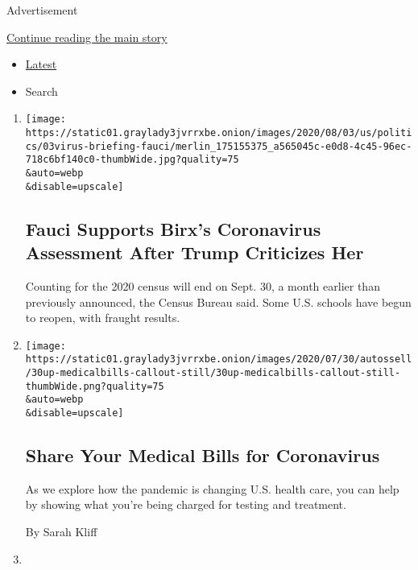 Advertisement

\protect\hyperlink{after-mid2}{Continue reading the main story}

\begin{itemize}
\tightlist
\item
  \protect\hyperlink{stream-panel}{Latest}
\item
  Search
\end{itemize}

\begin{enumerate}
\def\labelenumi{\arabic{enumi}.}
\item
  \href{/2020/08/03/world/coronavirus-covid-19.html}{}

  \texttt{[image: https://static01.graylady3jvrrxbe.onion/images/2020/08/03/us/politics/03virus-briefing-fauci/merlin\_175155375\_a565045c-e0d8-4c45-96ec-718c6bf140c0-thumbWide.jpg?quality=75\\\&auto=webp\\\&disable=upscale]}

  \hypertarget{fauci-supports-birxs-coronavirus-assessment-after-trump-criticizes-her}{%
  \subsection{Fauci Supports Birx's Coronavirus Assessment After Trump
  Criticizes
  Her}\label{fauci-supports-birxs-coronavirus-assessment-after-trump-criticizes-her}}

  Counting for the 2020 census will end on Sept. 30, a month earlier
  than previously announced, the Census Bureau said. Some U.S. schools
  have begun to reopen, with fraught results.
\item
  \href{/2020/08/03/reader-center/coronavirus-medical-bills.html}{}

  \texttt{[image: https://static01.graylady3jvrrxbe.onion/images/2020/07/30/autossell/30up-medicalbills-callout-still/30up-medicalbills-callout-still-thumbWide.png?quality=75\\\&auto=webp\\\&disable=upscale]}

  \hypertarget{share-your-medical-bills-for-coronavirus}{%
  \subsection{Share Your Medical Bills for
  Coronavirus}\label{share-your-medical-bills-for-coronavirus}}

  As we explore how the pandemic is changing U.S. health care, you can
  help by showing what you're being charged for testing and treatment.

  By Sarah Kliff
\item
  \href{/2020/08/03/upshot/nj-coronavirus-medical-bill.html}{}


\end{enumerate}
